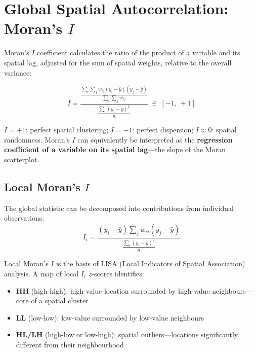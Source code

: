 \section{Global Spatial Autocorrelation: Moran's $I$}
\label{sec_MoranI}

Moran's $I$ coefficient calculates the ratio of the product of a variable
and its spatial lag, adjusted for the sum of spatial weights, relative to
the overall variance:

\begin{tcolorbox}[keyresult]
\begin{equation}
  I = \frac{\displaystyle
       \frac{\displaystyle\sum_i\sum_j w_{ij}(y_i-\bar{y})(y_j-\bar{y})}
            {\displaystyle\sum_i\sum_j w_{ij}}}
      {\displaystyle\frac{\sum_i(y_i-\bar{y})^2}{n}}
  \;\in\; [-1,\,+1]
  \label{eq_MoranI}
\end{equation}
\end{tcolorbox}

$I = +1$: perfect spatial clustering; $I = -1$: perfect dispersion;
$I \approx 0$: spatial randomness. Moran's $I$ can equivalently be
interpreted as the \textbf{regression coefficient of a variable on its
spatial lag}---the slope of the Moran scatterplot.

\subsection{Local Moran's $I$}

The global statistic can be decomposed into contributions from individual
observations:
\begin{equation}
  I_i = \frac{(y_i-\bar{y})\displaystyle\sum_j w_{ij}(y_j-\bar{y})}
             {\displaystyle\frac{\sum_i(y_i-\bar{y})^2}{n}}
  \label{eq_LocalMoran}
\end{equation}

Local Moran's $I$ \citep{Anselin1995} is the basis of LISA (Local Indicators
of Spatial Association) analysis. A map of local $I_i$ $z$-scores identifies:
\begin{itemize}
  \item \textbf{HH} (high-high): high-value location surrounded by
    high-value neighbours---core of a spatial cluster
  \item \textbf{LL} (low-low): low-value surrounded by low-value neighbours
  \item \textbf{HL/LH} (high-low or low-high): spatial outliers---locations
    significantly different from their neighbourhood
\end{itemize}


